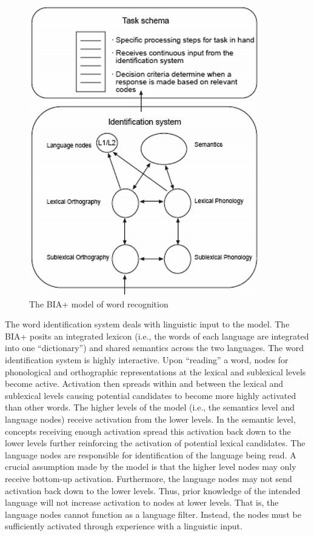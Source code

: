 \begin{figure}\label{BIA+}
\begin{center}
\includegraphics[scale=0.5]{Intro/Figures/biaplus.png}
\caption{The BIA+ model of word recognition \parencite[reprinted from][]{Dijkstra2002}}
\end{center}
\end{figure}

The word identification system deals with linguistic input to the model. The BIA+ posits an integrated lexicon (i.e., the words of each language are integrated into one “dictionary”) and shared semantics across the two languages. The word identification system is highly interactive. Upon “reading” a word, nodes for phonological and orthographic representations at the lexical and sublexical levels become active. Activation then spreads within and between the lexical and sublexical levels causing potential candidates to become more highly activated than other words. The higher levels of the model (i.e., the semantics level and language nodes) receive activation from the lower levels. In the semantic level, concepts receiving enough activation spread this activation back down to the lower levels further reinforcing the activation of potential lexical candidates. The language nodes are responsible for identification of the language being read. A crucial assumption made by the model is that the higher level nodes may only receive bottom-up activation. Furthermore, the language nodes may not send activation back down to the lower levels. Thus, prior knowledge of the intended language will not increase activation to nodes at lower levels. That is, the language nodes cannot function as a language filter. Instead, the nodes must be sufficiently activated through experience with a linguistic input.

